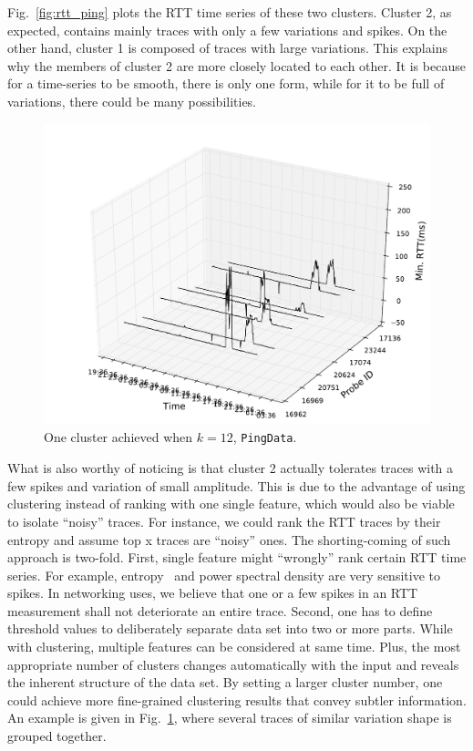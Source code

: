 Fig.~\ref{fig:rtt_ping} plots the RTT time series of these two clusters. Cluster 2, as expected, contains mainly traces with only a few variations and spikes. 
On the other hand, cluster 1 is composed of traces with large variations.
This explains why the members of cluster 2 are more closely located to each other. 
It is because for a time-series to be smooth, there is only one form, while for it to be full of variations, there could be many possibilities.

\begin{figure}[!htb]
\centering
\includegraphics[width=.8\textwidth]{gfx/chap3/rtt3d_ft_pam_cls8.pdf}
\caption{One cluster achieved when $k=12$, \texttt{PingData}.}
\label{fig:cls8_k12}
\end{figure}

What is also worthy of noticing is that cluster 2 actually tolerates traces with a few spikes and variation of small amplitude. 
This is due to the advantage of using clustering instead of ranking with one single feature, which would also be viable to isolate ``noisy'' traces. 
For instance, we could rank the RTT traces by their entropy and assume top x traces are ``noisy'' ones. 
The shorting-coming of such approach is two-fold.
First, single feature might ``wrongly'' rank certain RTT time series. 
For example, entropy~\cite{Molina-Pico2011} and power spectral density are very sensitive to spikes. 
In networking uses, we believe that one or a few spikes in an RTT measurement shall not deteriorate an entire trace. 
Second, one has to define threshold values to deliberately separate data set into two or more parts. 
While with clustering, multiple features can be considered at same time. 
Plus, the most appropriate number of clusters changes automatically with the input and reveals the inherent structure of the data set. 
By setting a larger cluster number, one could achieve more fine-grained clustering results that convey subtler information. An example is given in Fig.~\ref{fig:cls8_k12}, where several traces of similar variation shape is grouped together.

